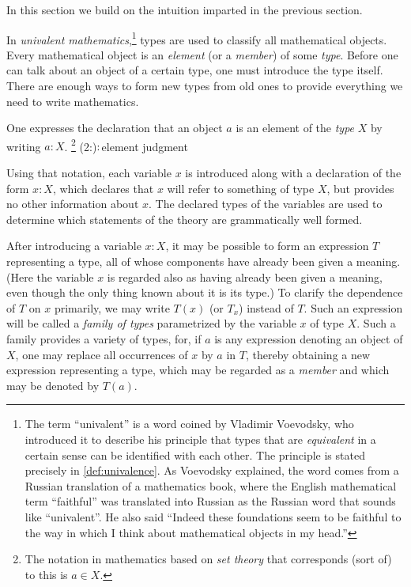 In this section we build on the intuition imparted in the previous section.

In \emph{univalent mathematics},\footnote{The term ``univalent'' is a word coined by Vladimir Voevodsky, who
introduced it to describe his principle that types that are \emph{equivalent} in a certain sense can be identified with each other.  The
principle is stated precisely in \cref{def:univalence}.  As Voevodsky explained, the word comes from a Russian translation of a mathematics
book, where the English mathematical term ``faithful'' was translated into Russian as the Russian word that sounds like ``univalent''.  He also
said ``Indeed these foundations seem to be faithful to the way in which I think about mathematical objects in my head.''} types are used to
classify all mathematical objects.  Every mathematical object is an \emph{element} (or a \emph{member}) of some \emph{type}.  Before
one can talk about an object of a certain type, one must introduce the type itself.  There are enough ways to form new types from old ones to
provide everything we need to write mathematics.

One expresses the declaration that an object $a$ is an element of the \emph{type} $X$ by writing $a:X$.%
\footnote{The notation in mathematics based on \emph{set theory} that corresponds (sort of) to this is $a \in X$.}
\glossary(2:){${:}$}{element judgment}

Using that notation, each variable $x$ is introduced along with a declaration of the form $x:X$, which declares that $x$ will refer to something
of type $X$, but provides no other information about $x$.  The declared types of the variables are used to determine which statements of the
theory are grammatically well formed.

After introducing a variable $x:X$, it may be possible to form an expression $T$ representing a type, all of whose components have
already been given a meaning.
(Here the variable $x$ is regarded also as having already been given a meaning, even though the only thing known about it is its type.)
To clarify the dependence of $T$ on $x$ primarily, we may write $T(x)$ (or $T_x$) instead of $T$.
Such an expression will be called a \emph{family of types}  parametrized by the variable $x$ of type $X$.
Such a family provides a variety of types, for, if $a$ is any expression denoting an object of $X$, one may replace all
occurrences of $x$ by $a$ in $T$, thereby obtaining a new expression representing a type, which may be regarded as a \emph{member}
and which may be denoted by $T(a)$.

